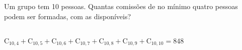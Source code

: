\begin{ex}
 Um grupo tem 10 pessoas. Quantas comissões de no mínimo quatro pessoas podem ser  formadas, com as disponíveis?
   \begin{sol}
    \phantom{A} \\
    $\mathrm{C}_{{10},4}+\mathrm{C}_{{10},5}+\mathrm{C}_{{10},6}+\mathrm{C}_{{10},7}+\mathrm{C}_{{10},8}+\mathrm{C}_{{10},9}+\mathrm{C}_{{10},{10}}=848$
   \end{sol}
\end{ex}